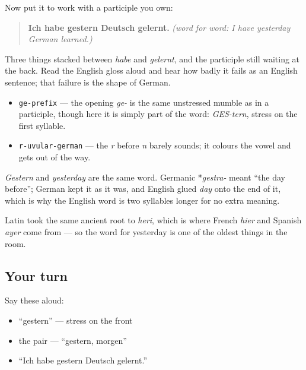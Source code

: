 Now put it to work with a participle you own:

\begin{quote}
\textbf{Ich habe gestern Deutsch gelernt.} \emph{(word for word: I have yesterday German learned.)}
\end{quote}

Three things stacked between \emph{habe} and \emph{gelernt}, and the participle still waiting at the back. Read the English gloss aloud and hear how badly it fails as an English sentence; that failure is the shape of German.

\begin{sounds}
\begin{itemize}
\raggedright
  \item \texttt{ge-prefix} — the opening \emph{ge-} is the same unstressed mumble as in a participle, though here it is simply part of the word: \emph{GES-tern}, stress on the first syllable.
  \item \texttt{r-uvular-german} — the \emph{r} before \emph{n} barely sounds; it colours the vowel and gets out of the way.
\end{itemize}
\end{sounds}

\begin{cousinweb}
\emph{Gestern} and \emph{yesterday} are the same word. Germanic *\emph{gestra-} meant \textquotedblleft{}the day before\textquotedblright{}; German kept it as it was, and English glued \emph{day} onto the end of it, which is why the English word is two syllables longer for no extra meaning.

Latin took the same ancient root to \emph{heri}, which is where French \emph{hier} and Spanish \emph{ayer} come from — so the word for yesterday is one of the oldest things in the room.
\end{cousinweb}

\subsection*{Your turn}
Say these aloud:

\begin{itemize}
\raggedright
  \item \textquotedblleft{}gestern\textquotedblright{} — stress on the front
  \item the pair — \textquotedblleft{}gestern, morgen\textquotedblright{}
  \item \textquotedblleft{}Ich habe gestern Deutsch gelernt.\textquotedblright{}
\end{itemize}

